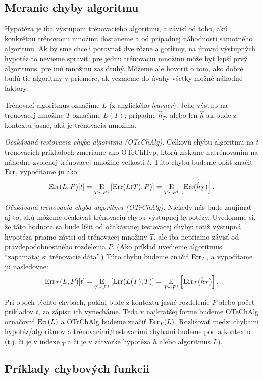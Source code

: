 \subsection{Meranie chyby algoritmu}

Hypotéza je iba výstupom trénovacieho algoritmu, a závisí od toho, akú
konkrétnu trénovaciu množinu dostaneme a od prípadnej náhodnosti
samotného algoritmu. Ak by sme chceli porovnať dve rôzne algoritmy,
na úrovni výstupných hypotéz to nevieme spraviť: pre jednu trénovaciu
množinu môže byť lepší prvý algoritmus, pre inú množinu zas druhý.
Môžeme ale hovoriť o tom, ako dobré budú tie algoritmy v priemere,
ak vezmeme do úvahy všetky možné náhodné faktory.

Trénovací algoritmus označíme $L$ (z anglického \emph{learner}). Jeho
výstup na trénovacej množine $T$ označíme $L(T)$; prípadne $\hat{h}_T$,
alebo len $\hat{h}$ ak bude z kontextu jasné, aká je trénovacia množina.

\emph{Očakávaná testovacia chyba algoritmu (OTeChAlg).} Celkovú chybu
algoritmu na $t$ trénovacích príkladoch zmeriame ako OTeChHyp, ktorú
získame natrénovaním na náhodne zvolenej trénovacej množine veľkosti $t$.
Túto chybu budeme opäť značiť $\mathrm{Err}$, vypočítame ju ako
$$\mathrm{Err}(L, P)[t] = \operatorname*{\mathrm{E}}_{T \sim P^t} \left[ \mathrm{Err}(L(T), P) \right] = \operatorname*{\mathrm{E}}_{T \sim P^t} \left[ \mathrm{Err}(\hat{h}_T) \right].$$

\emph{Očakávaná trénovacia chyba algoritmu (OTrChAlg).} Niekedy nás bude zaujímať aj to,
akú môžeme očakávať trénovaciu chybu výstupnej hypotézy. Uvedomme si,
že táto hodnota sa bude líšiť od očakávanej testovacej chyby: totiž
výstupná hypotéza priamo závisí od trénovacej množiny $T$, ale iba
nepriamo závisí od pravdepodobnostného rozdelenia $P$. (Ako príklad
uvedieme algoritmus ``zapamätaj si trénovacie dáta''.) Túto chybu
budeme značiť $\mathrm{Err}_T$, a vypočítame ju nasledovne:
$$\mathrm{Err}_T(L, P)[t] = \operatorname*{\mathrm{E}}_{T \sim P^t} \left[ \mathrm{Err}(L(T), T) \right] = \operatorname*{\mathrm{E}}_{T \sim P^t} \left[ \mathrm{Err}_T(\hat{h}_T) \right].$$

Pri oboch týchto chybách, pokiaľ bude z kontextu jasné rozdelenie $P$
alebo počet príkladov $t$, zo zápisu ich vynecháme. Teda v najkratšej
forme budeme OTeChAlg označovať $\mathrm{Err}(L)$ a OTrChAlg budeme značiť
$\mathrm{Err}_T(L)$. Rozlišovať medzi chybami hypotéz/algoritmov
a trénovacími/testovacími chybami budeme podľa kontextu (t.j. či je
v indexe $_T$ a či je v zátvorke hypotéza $h$ alebo algoritmus $L$).



\subsection{Príklady chybových funkcii}


